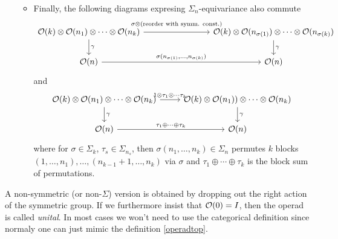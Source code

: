 \documentclass[TFM.tex]{subfiles}
\begin{document}
\begin{defi}
\begin{enumerate}
\begin{itemize}
\[\]
\item Finally, the following diagrams expresing $\Sigma_n$-equivariance also commute
\[
\begin{tikzcd}[column sep =80]
\OO(k)\otimes \OO(n_1)\otimes \cdots \otimes \OO(n_k)\arrow[d, "\gamma"] \arrow[r, outer sep=4pt, "\sigma\otimes(\text{reorder with symm. const.})"]& \OO(k)\otimes\OO(n_{\sigma(1)})\otimes\cdots\otimes \OO(n_{\sigma(k)})\arrow[d, "\gamma"]\\
\OO(n) \arrow[r, "{\sigma(n_{\sigma(1)},\dots,n_{\sigma(k)})}"]& \OO(n)
\end{tikzcd}
\]
and
\[
\begin{tikzcd}
\OO(k)\otimes \OO(n_1)\otimes \cdots \otimes \OO(n_k)\arrow[r, "1\otimes \tau_1\otimes\cdots\tau_k"]\arrow[d, "\gamma"] & \OO(k)\otimes\OO(n_1))\otimes\cdots\otimes \OO(n_k)\arrow[d,"\gamma"]\\
\OO(n)\arrow[r, "\tau_1\oplus\cdots\oplus\tau_k"] & \OO(n)
\end{tikzcd}
\]
where for $\sigma\in\Sigma_k$, $\tau_s\in\Sigma_{n_s}$, then $\sigma(n_1,\dots, n_k)\in\Sigma_n$ permutes $k$ blocks $(1,\dots, n_1),\dots, (n_{k-1}+1,\dots, n_k)$ via $\sigma$ and $\tau_1\oplus\cdots\oplus\tau_k$ is the block sum of permutations.
\end{itemize}

\end{enumerate}



\end{defi}

A non-symmetric (or non-$\Sigma$) version is obtained by dropping out the right action of the symmetric group. %
If we furthermore insist that ${\mathcal O}(0)=I$, then the operad is called \emph{unital}. In most cases we won't need to use the categorical definition since normaly one can just mimic the definition \ref{operadtop}.
\end{document}
